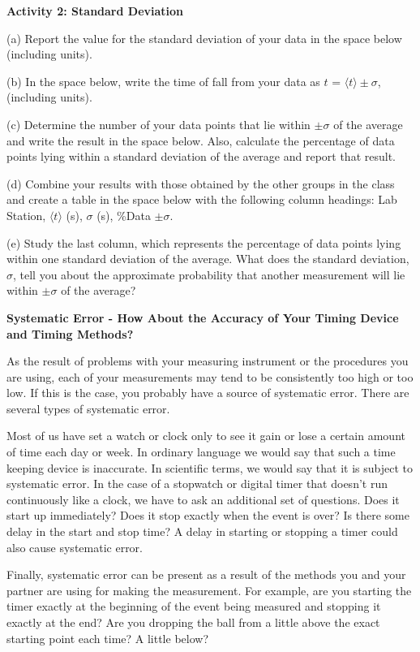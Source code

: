 \textbf{Activity 2: Standard Deviation} 

(a) Report the value for the standard deviation of your data in the space below (including units).
\answerspace{10mm}

(b) In the space below, write the time of fall from your data as $t$ = \(\langle t\rangle 
\pm  \sigma  \), (including units).
\answerspace{10mm}

(c) Determine the number of your data points that lie within \( \pm  \sigma  \)
of the average and write the result in the space below. Also, calculate the
percentage of data points lying within a standard deviation of the average and
report that result.
\answerspace{10mm}

(d) Combine your results with those obtained by the other groups in the class
and create a table in the space below with the following column headings: Lab
Station, \( \langle t\rangle\) (s), \( \sigma  \) (s), \%Data \( \pm \sigma  \).
\answerspace{40mm}

(e) Study the last column, which represents the percentage of data points lying
within one standard deviation of the average. What does the standard deviation,
\( \sigma  \), tell you about the approximate probability that another measurement
will lie within \( \pm \sigma  \) of the average?
\answerspace{15mm}

\pagebreak[2]
\textbf{Systematic Error - How About the Accuracy of Your Timing Device and
Timing Methods?} 

As the result of problems with your measuring instrument or the procedures you
are using, each of your measurements may tend to be consistently too high or
too low. If this is the case, you probably have a source of systematic error.
There are several types of systematic error.

Most of us have set a watch or clock only to see it gain or lose a certain amount
of time each day or week. In ordinary language we would say that such a time
keeping device is inaccurate. In scientific terms, we would say that it is subject
to systematic error. In the case of a stopwatch or digital timer that doesn't
run continuously like a clock, we have to ask an additional set of questions.
Does it start up immediately? Does it stop exactly when the event is over? Is
there some delay in the start and stop time? A delay in starting or stopping
a timer could also cause systematic error.

Finally, systematic error can be present as a result of the methods you and
your partner are using for making the measurement. For example, are you starting
the timer exactly at the beginning of the event being measured and stopping
it exactly at the end? Are you dropping the ball from a little above the exact
starting point each time? A little below?


